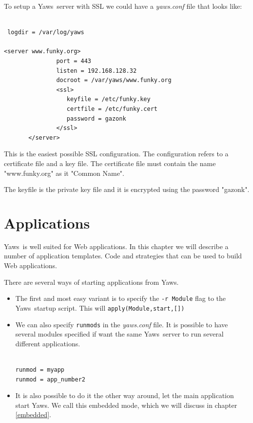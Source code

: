 \documentclass[11pt,oneside,english]{book}
\newcommand{\Yaws}            %
        {{\sc Yaws}}
\begin{document}
To setup a \Yaws\ server with SSL we could have a \textit{yaws.conf}
file that looks like:

\begin{verbatim}

 logdir = /var/log/yaws

<server www.funky.org>
               port = 443
               listen = 192.168.128.32
               docroot = /var/yaws/www.funky.org
               <ssl>
                  keyfile = /etc/funky.key
                  certfile = /etc/funky.cert
                  password = gazonk
               </ssl>
       </server>
\end{verbatim}

This is the easiest possible SSL configuration. The configuration
refers to a certificate file and a key file. The certificate file
must contain the name "www.funky.org" as it "Common Name".

The keyfile is the private key file and it is encrypted using
the password "gazonk".


\chapter{Applications}

\Yaws\  is well suited for Web applications. In this chapter we will
describe a number of application templates. Code and strategies that
can be used to build Web applications.

There are several ways of starting applications from \Yaws{}.

\begin{itemize}
\item The first and most easy variant is to specify the
  \verb+-r Module+ flag to the \Yaws\ startup script.  This will
  \verb+apply(Module,start,[])+

\item We can also specify \verb+runmods+ in the \textit{yaws.conf}
  file.  It is possible to have several modules specified if want the
  same \Yaws\ server to run several different applications.

\begin{verbatim}

runmod = myapp
runmod = app_number2

\end{verbatim}

\item It is also possible to do it the other way around, let the main
  application start \Yaws{}. We call this embedded mode, which we will
  discuss in chapter \ref{embedded}.

\end{itemize}
\end{document}
